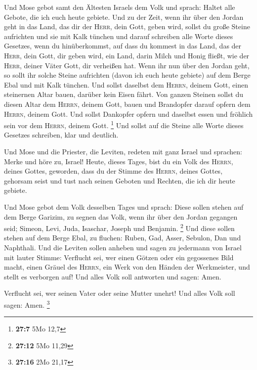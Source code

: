  Und Mose gebot samt den Ältesten Israels dem Volk und
sprach: Haltet alle Gebote, die ich euch heute gebiete. 
Und zu der Zeit, wenn ihr über den Jordan geht in das Land, das dir der
\textsc{Herr}, dein Gott, geben wird, sollst du große Steine aufrichten
und sie mit Kalk tünchen  und darauf schreiben alle Worte
dieses Gesetzes, wenn du hinüberkommst, auf dass du kommest in das Land,
das der \textsc{Herr}, dein Gott, dir geben wird, ein Land, darin Milch
und Honig fließt, wie der \textsc{Herr}, deiner Väter Gott, dir
verheißen hat.  Wenn ihr nun über den Jordan geht, so
sollt ihr solche Steine aufrichten (davon ich euch heute gebiete) auf
dem Berge Ebal und mit Kalk tünchen.  Und sollst daselbst
dem \textsc{Herrn}, deinem Gott, einen steinernen Altar bauen, darüber
kein Eisen fährt.  Von ganzen Steinen sollst du diesen
Altar dem \textsc{Herrn}, deinem Gott, bauen und Brandopfer darauf
opfern dem \textsc{Herrn}, deinem Gott.  Und sollst
Dankopfer opfern und daselbst essen und fröhlich sein vor dem
\textsc{Herrn}, deinem Gott. \footnote{\textbf{27:7} 5Mo 12,7}
 Und sollst auf die Steine alle Worte dieses Gesetzes
schreiben, klar und deutlich.

 Und Mose und die Priester, die Leviten, redeten mit ganz
Israel und sprachen: Merke und höre zu, Israel! Heute, dieses Tages,
bist du ein Volk des \textsc{Herrn}, deines Gottes, geworden,
 dass du der Stimme des \textsc{Herrn}, deines Gottes,
gehorsam seist und tust nach seinen Geboten und Rechten, die ich dir
heute gebiete.

 Und Mose gebot dem Volk desselben Tages und sprach:
 Diese sollen stehen auf dem Berge Garizim, zu segnen das
Volk, wenn ihr über den Jordan gegangen seid; Simeon, Levi, Juda,
Isaschar, Joseph und Benjamin. \footnote{\textbf{27:12} 5Mo 11,29}
 Und diese sollen stehen auf dem Berge Ebal, zu fluchen:
Ruben, Gad, Asser, Sebulon, Dan und Naphthali.  Und die
Leviten sollen anheben und sagen zu jedermann von Israel mit lauter
Stimme:  Verflucht sei, wer einen Götzen oder ein
gegossenes Bild macht, einen Gräuel des \textsc{Herrn}, ein Werk von den
Händen der Werkmeister, und stellt es verborgen auf! Und alles Volk soll
antworten und sagen: Amen.

 Verflucht sei, wer seinen Vater oder seine Mutter
unehrt! Und alles Volk soll sagen: Amen. \footnote{\textbf{27:16} 2Mo
  21,17}

